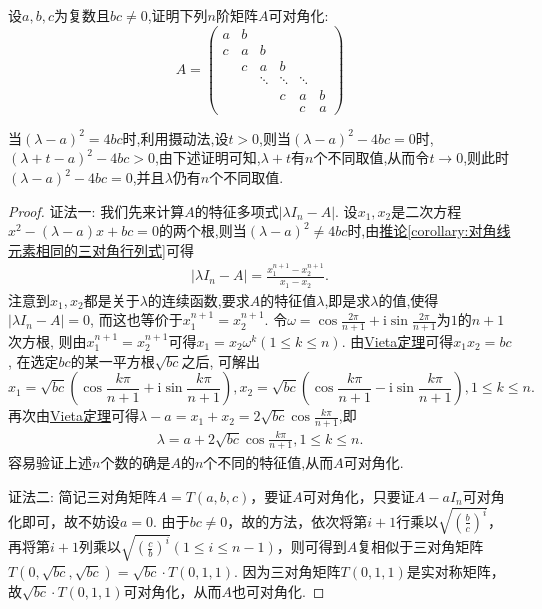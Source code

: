\documentclass[../../main.tex]{subfiles}
\begin{document}
\begin{proposition}\label{proposition:三对角矩阵必可对角化}
设$a,b,c$为复数且$bc\neq0$,证明下列$n$阶矩阵$A$可对角化:
\[
A = 
\begin{pmatrix}
a&b&&&\\
c&a&b&&\\
&c&a&b&\\
&&\ddots&\ddots&\ddots\\
&&&c&a&b\\
&&&&c&a
\end{pmatrix}
\]
\end{proposition}
\begin{note}
当$(\lambda-a)^2=4bc$时,利用摄动法,设$t>0$,则当$(\lambda-a)^2-4bc=0$时,$(\lambda+t-a)^2-4bc>0$,由下述证明可知,$\lambda+t$有$n$个不同取值,从而令$t \to 0$,则此时$(\lambda-a)^2-4bc=0$,并且$\lambda$仍有$n$个不同取值.
\end{note}
\begin{proof}
{\color{blue}证法一:}
我们先来计算$A$的特征多项式$|\lambda I_n - A|$. 设$x_1,x_2$是二次方程$x^2 - (\lambda - a)x + bc = 0$的两个根,则当$(\lambda-a)^2\ne 4bc$时,由\hyperref[corollary:对角线元素相同的三对角行列式]{推论\ref{corollary:对角线元素相同的三对角行列式}}可得
\begin{align*}
|\lambda I_n - A|=\frac{x_1^{n + 1}-x_2^{n + 1}}{x_1 - x_2}.
\end{align*}
注意到$x_1,x_2$都是关于$\lambda$的连续函数,要求$A$的特征值$\lambda$,即是求$\lambda$的值,使得$|\lambda I_n - A| = 0$, 而这也等价于$x_1^{n + 1}=x_2^{n + 1}$. 令$\omega=\cos\frac{2\pi}{n + 1}+\mathrm{i}\sin\frac{2\pi}{n + 1}$为$1$的$n + 1$次方根, 则由$x_1^{n + 1}=x_2^{n + 1}$可得$x_1 = x_2\omega^k(1\leqslant  k\leqslant  n)$. 由\hyperref[theorem:Vieta定理]{Vieta定理}可得$x_1x_2 = bc$, 在选定$bc$的某一平方根$\sqrt{bc}$之后, 可解出
\[
x_1=\sqrt{bc}\left(\cos\frac{k\pi}{n + 1}+\mathrm{i}\sin\frac{k\pi}{n + 1}\right), x_2=\sqrt{bc}\left(\cos\frac{k\pi}{n + 1}-\mathrm{i}\sin\frac{k\pi}{n + 1}\right), 1\leqslant  k\leqslant  n.
\]
再次由\hyperref[theorem:Vieta定理]{Vieta定理}可得$\lambda - a = x_1 + x_2 = 2\sqrt{bc}\cos\frac{k\pi}{n + 1}$,即
\begin{align*}
\lambda=a + 2\sqrt{bc}\cos\frac{k\pi}{n + 1}, 1\leqslant  k\leqslant  n.
\end{align*}
容易验证上述$n$个数的确是$A$的$n$个不同的特征值,从而$A$可对角化.

{\color{blue}证法二:}
简记三对角矩阵\(A = T(a,b,c)\)，要证\(A\)可对角化，只要证\(A - aI_n\)可对角化即可，故不妨设\(a = 0\). 由于\(bc\neq0\)，故的方法，依次将第\(i + 1\)行乘以\(\sqrt{(\frac{b}{c})^i}\)，再将第\(i + 1\)列乘以\(\sqrt{(\frac{c}{b})^i}(1\leqslant  i\leqslant  n - 1)\)，则可得到\(A\)复相似于三对角矩阵\(T(0,\sqrt{bc},\sqrt{bc})=\sqrt{bc}\cdot T(0,1,1)\). 因为三对角矩阵\(T(0,1,1)\)是实对称矩阵，故\(\sqrt{bc}\cdot T(0,1,1)\)可对角化，从而\(A\)也可对角化. 
\end{proof}
\end{document}

